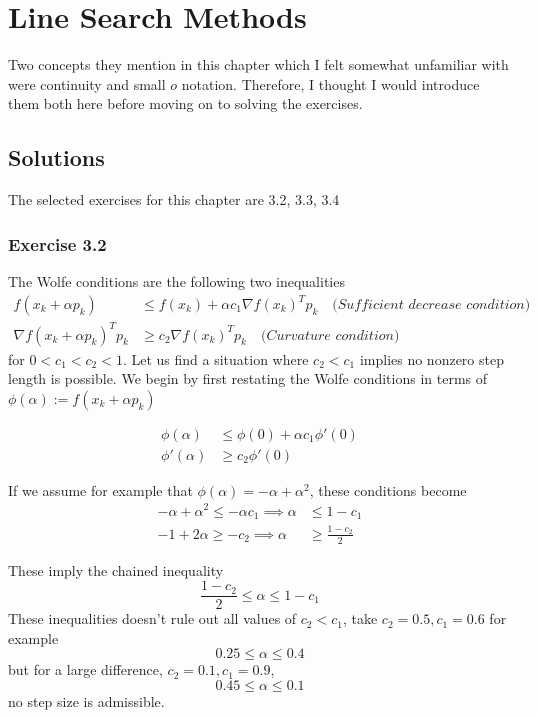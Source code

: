 \newpage
\section{Line Search Methods}
Two concepts they mention in this chapter which I felt somewhat unfamiliar with were  continuity and small $o$ notation.
Therefore, I thought I would introduce them both here before moving on to solving the exercises.

\subsection{Solutions}
The selected exercises for this chapter are 3.2, 3.3, 3.4

\subsubsection{Exercise 3.2}
The Wolfe conditions are the following two inequalities
\begin{equation}
    \begin{aligned}
        f(x_k + \alpha p_k)              & \leq f(x_k) + \alpha c_1 \nabla f(x_k)^T p_k \quad \textit{(Sufficient decrease condition)} \\
        \nabla f(x_k + \alpha p_k)^T p_k & \geq c_2 \nabla f(x_k)^T p_k  \quad \textit{(Curvature condition)}
    \end{aligned}
    \label{eq:wolfe_conditions}
\end{equation}
for $0 < c_1 < c_2 < 1$.
Let us find a situation where $c_2 < c_1$ implies no nonzero step length is possible.
We begin by first restating the Wolfe conditions in terms of $\phi(\alpha) := f(x_k + \alpha p_k)$

\begin{align*}
    \phi(\alpha)  & \leq \phi(0) + \alpha c_1 \phi'(0) \\
    \phi'(\alpha) & \geq c_2 \phi'(0)
\end{align*}

If we assume for example that $\phi(\alpha) = -\alpha + \alpha^2$, these conditions become
\begin{align*}
    -\alpha + \alpha^2   \leq -\alpha c_1 \implies \alpha & \leq 1 - c_1           \\
    -1 + 2\alpha  \geq -c_2 \implies \alpha               & \geq \frac{1 - c_2}{2}
\end{align*}

These imply the chained inequality
\[
    \frac{1 - c_2}{2} \leq \alpha \leq 1 - c_1
\]
These inequalities doesn't rule out all values of $c_2 < c_1$, take $c_2 = 0.5, c_1 = 0.6$ for example
\[
    0.25 \leq \alpha \leq 0.4
\]
but for a large difference, $c_2 = 0.1, c_1 = 0.9$,
\[
    0.45 \leq \alpha \leq 0.1
\]
no step size is admissible.



